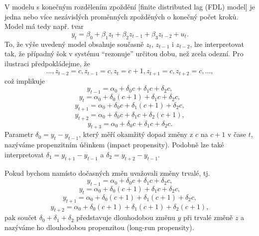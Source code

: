 V modelu s konečným rozdělením zpoždění [finite distributed lag (FDL) model] je jedna nebo více 
nezávislých proměnných zpožděných o konečný počet kroků. 
Model má tedy např. tvar
\begin{equation}
	y_t = \beta_0 + \beta_1 z_t + \beta_2 z_{t - 1} + \beta_3 z_{t - 2} 
	+ u_t.
\end{equation}
To, že výše uvedený model obsahuje současně $z_t$, $z_{t - 1}$ i 
$z_{t - 2}$, lze interpretovat tak, že případný šok v systému ``rezonuje'' určitou dobu, než zcela odezní. Pro ilustraci předpokládejme, že
\begin{equation}
	..., z_{t - 2} = c, z_{t - 1} = c, z_t = c + 1, z_{t + 1} = c, z_{t 
	+ 2} = c , ...,
\end{equation}
což implikuje
\begin{equation}
	y_{t - 1} = \alpha_0 + \delta_0 c + \delta_1 c + \delta_2 c,
\end{equation}
\begin{equation}
	y_t = \alpha_0 + \delta_0(c + 1) + \delta_1 c + \delta_2 c,
\end{equation}
\begin{equation}
	y_{t + 1} = \alpha_0 + \delta_0 c + \delta_1 (c + 1) + \delta_2 c,
\end{equation}
\begin{equation}
	y_{t + 2} = \alpha_0 + \delta_0 c + \delta_1 c + \delta_2 (c + 1),
\end{equation}
\begin{equation}
	y_{t + 3} = \alpha_0 + \delta_0 c + \delta_1 c + \delta_2 c.
\end{equation}
Parametr $\delta_0 = y_t - y_{t - 1}$, který měří okamžitý dopad 
změny z $c$ na $c + 1$ v čase $t$, nazýváme propenzitním účinkem 
(impact propensity). Podobně lze také interpretovat $\delta_1 = y_{t 
+ 1} - y_{t - 1}$ a $\delta_2 = y_{t + 2} - y_{t - 1}$.

Pokud bychom namísto dočasných změn uvažovali změny trvalé, tj.
\begin{equation}
	y_{t - 1} = \alpha_0 + \delta_0 c + \delta_1 c + \delta_2 c,
\end{equation}
\begin{equation}
	y_t = \alpha_0 + \delta_0(c + 1) + \delta_1 c + \delta_2 c,
\end{equation}
\begin{equation}
	y_{t + 1} = \alpha_0 + \delta_0 (c + 1) + \delta_1 (c + 1) + \delta_2 c,
\end{equation}
\begin{equation}
	y_{t + 2} = \alpha_0 + \delta_0 (c + 1) + \delta_1 (c + 1) + \delta_2 (c + 1),
\end{equation}
pak součet $\delta_0 + \delta_1 + \delta_2$ představuje dlouhodobou změnu 
$y$ při trvalé změně $z$ a nazýváme ho dlouhodobou propenzitou 
(long-run propensity).

